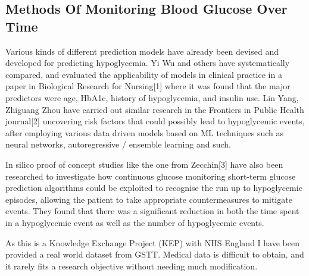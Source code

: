 \subsection{Methods Of Monitoring Blood Glucose Over Time}




















\begin{flushleft}
Various kinds of different prediction models have already been devised and developed for predicting hypoglycemia. Yi Wu and others have systematically compared, and evaluated the applicability of models in clinical practice in a paper in Biological Research for Nursing[1] 
where it was found that the major predictors were age, HbA1c, history of hypoglycemia, and insulin use. Lin Yang, Zhiguang Zhou have carried out similar research in the Frontiers in Public Health journal[2] uncovering risk factors that could possibly lead to hypoglycemic 
events, after employing various data driven models based on ML techniques such as neural networks, autoregressive / ensemble learning and such. \\ \vspace{5pt}

In silico proof of concept studies like the one from Zecchin[3] have also been researched to investigate how continuous glucose monitoring short-term glucose prediction algorithms could be exploited to recognise the run up to hypoglycemic episodes, allowing the patient to 
take appropriate countermeasures to mitigate events. They found that there was a significant reduction in both the time spent in a hypoglycemic event as well as the number 
of hypoglycemic events. \\ \vspace{5pt}

As this is a Knowledge Exchange Project (KEP) with NHS England I have been provided a real world dataset from GSTT. Medical data is difficult to obtain, and it rarely fits a research objective without needing much modification. 

\end{flushleft}